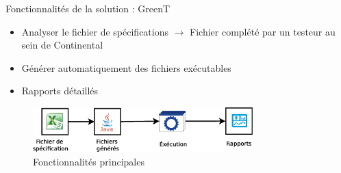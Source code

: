 \begin{frame}{Fonctionnalités de la solution : GreenT}
\vspace{-10px}
	\begin{itemize}
		\item Analyser le fichier de spécifications\newline
			\footnotesize
			$\rightarrow$ Fichier complété par un testeur au sein de Continental
			\normalsize

		\item Générer automatiquement des fichiers exécutables
		\item Rapports détaillés

	\end{itemize}
	\vfill
	\begin{figure}[H]
		\centering
		\includegraphics[width=8.5cm]{images/fct.eps}
		\caption{Fonctionnalités principales}
	\end{figure}
\end{frame}

